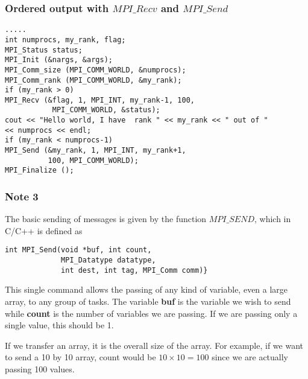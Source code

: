 \documentclass{beamer}
\begin{document}
\begin{frame}
\frametitle{Ordered output with $MPI\_Recv$ and $MPI\_Send$}

\begin{block}{}


\begin{Verbatim}[numbers=none,fontsize=\fontsize{9pt}{9pt},baselinestretch=0.95]
.....
int numprocs, my_rank, flag;
MPI_Status status;
MPI_Init (&nargs, &args);
MPI_Comm_size (MPI_COMM_WORLD, &numprocs);
MPI_Comm_rank (MPI_COMM_WORLD, &my_rank);
if (my_rank > 0)
MPI_Recv (&flag, 1, MPI_INT, my_rank-1, 100, 
           MPI_COMM_WORLD, &status);
cout << "Hello world, I have  rank " << my_rank << " out of " 
<< numprocs << endl;
if (my_rank < numprocs-1)
MPI_Send (&my_rank, 1, MPI_INT, my_rank+1, 
          100, MPI_COMM_WORLD);
MPI_Finalize ();
\end{Verbatim}

\end{block}
\end{frame}

\begin{frame}
\frametitle{Note 3}

\begin{block}{}


The basic sending of messages is given by the function $MPI\_SEND$, which in C/C++
is defined as 
\begin{verbatim}
int MPI_Send(void *buf, int count, 
             MPI_Datatype datatype, 
             int dest, int tag, MPI_Comm comm)}
\end{verbatim}
This single command allows the passing of any kind of variable, even a large array, to any group of tasks. 
The variable \textbf{buf} is the variable we wish to send while \textbf{count}
is the  number of variables we are passing. If we are passing only a single value, this should be 1. 

If we transfer an array, it is  the overall size of the array. 
For example, if we want to send a 10 by 10 array, count would be $10\times 10=100$ 
since we are  actually passing 100 values.  


\end{block}
\end{frame}
\end{document}
